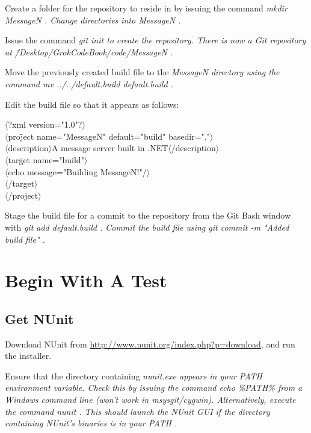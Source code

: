 Create a folder for the repository to reside in by issuing the command \em mkdir MessageN \em. Change directories into \em MessageN \em.

Issue the command \em git init \em to create the repository. There is now a Git repository at \em \~/Desktop/GrokCodeBook/code/MessageN \em.

Move the previously created build file to the \em MessageN \em directory using the command \em mv ../../default.build default.build \em.

Edit the build file so that it appears as follows:

\begin{tabbing}
$\langle$?xml version="1.0"?$\rangle$ \\
$\langle$pro\=ject name="MessageN" default="build" basedir="."$\rangle$ \\
\>$\langle$description$\rangle$A message server built in \CSharp.NET$\langle$/description$\rangle$ \\
\>$\langle$tar\=get name="build"$\rangle$ \\
\>\>$\langle$echo message="Building MessageN!"/$\rangle$ \\
\>$\langle$/target$\rangle$ \\
$\langle$/project$\rangle$
\end{tabbing}

Stage the build file for a commit to the repository from the Git Bash window with \em git add default.build \em. Commit the build file using \em git commit -m "Added build file" \em.

\section{Begin With A Test}

\subsection{Get NUnit}
Download NUnit from \url{http://www.nunit.org/index.php?p=download}, and run the installer.

Ensure that the directory containing \em nunit.exe \em appears in your \em PATH \em environment variable. Check this by issuing the command \em echo \%PATH\% \em from a Windows command line (won't work in msysgit/cygwin). Alternatively, execute the command \em nunit \em. This should launch the NUnit \gls{GUI} if the directory containing NUnit's binaries is in your \em PATH \em.